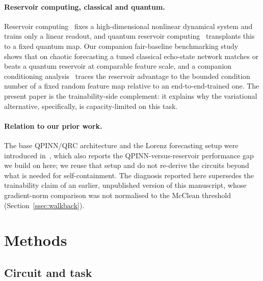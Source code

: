\documentclass[a4paper,12pt]{iopart}
\begin{document}
\paragraph{Reservoir computing, classical and quantum.}
Reservoir computing~\cite{jaeger2004harnessing,pathak2018model} fixes a
high-dimensional nonlinear dynamical system and trains only a linear readout,
and quantum reservoir
computing~\cite{fujii2017,mujal2021,nakajima2019boosting,ahmed2025robust}
transplants this to a fixed quantum map. Our companion fair-baseline
benchmarking study~\cite{pandey2607b} shows that on chaotic
forecasting a tuned classical echo-state network matches or beats a quantum
reservoir at comparable feature scale, and a companion conditioning
analysis~\cite{pandey2607} traces the reservoir advantage to the
bounded condition number of a fixed random feature map relative to an
end-to-end-trained one. The present paper is the trainability-side complement:
it explains why the variational alternative, specifically, is capacity-limited
on this task.

\paragraph{Relation to our prior work.}
The base QPINN/QRC architecture and the Lorenz forecasting setup were introduced
in~\cite{pandey2604}, which also reports the QPINN-versus-reservoir performance
gap we build on here; we reuse that setup and do not re-derive the circuits
beyond what is needed for self-containment. The diagnosis reported here
supersedes the trainability claim of an earlier, unpublished version of this
manuscript, whose gradient-norm comparison was not normalised to the McClean
threshold (Section~\ref{ssec:walkback}).

\section{Methods}
\label{sec:methods}

\subsection{Circuit and task}
\label{ssec:methods-circuit}
\end{document}
